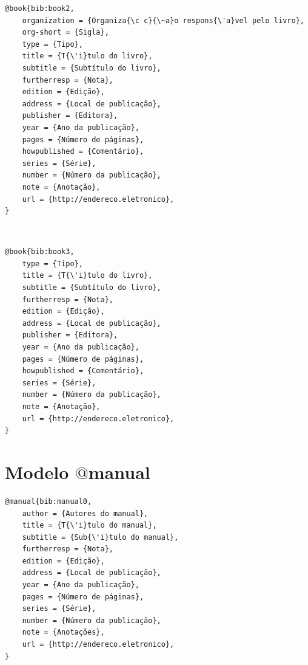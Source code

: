 \documentclass[a4paper,12pt,oneside,onecolumn,final,fleqn]{repUERJ}
\begin{document}
\noindent{}

\begin{verbatim}
@book{bib:book2,
    organization = {Organiza{\c c}{\~a}o respons{\'a}vel pelo livro},
    org-short = {Sigla},
    type = {Tipo},
    title = {T{\'i}tulo do livro},
    subtitle = {Subtítulo do livro},
    furtherresp = {Nota},
    edition = {Edição},
    address = {Local de publicação},
    publisher = {Editora},
    year = {Ano da publicação},
    pages = {Número de páginas},
    howpublished = {Comentário},
    series = {Série},
    number = {Número da publicação},
    note = {Anotação},
    url = {http://endereco.eletronico},
}
\end{verbatim}

\noindent{}\\

\begin{verbatim}
@book{bib:book3,
    type = {Tipo},
    title = {T{\'i}tulo do livro},
    subtitle = {Subtítulo do livro},
    furtherresp = {Nota},
    edition = {Edição},
    address = {Local de publicação},
    publisher = {Editora},
    year = {Ano da publicação},
    pages = {Número de páginas},
    howpublished = {Comentário},
    series = {Série},
    number = {Número da publicação},
    note = {Anotação},
    url = {http://endereco.eletronico},
}
\end{verbatim}

\section{Modelo $@$manual}

\noindent{}

\begin{verbatim}
@manual{bib:manual0,
    author = {Autores do manual},
    title = {T{\'i}tulo do manual},
    subtitle = {Sub{\'i}tulo do manual},
    furtherresp = {Nota},
    edition = {Edição},
    address = {Local de publicação},
    year = {Ano da publicação},
    pages = {Número de páginas},
    series = {Série},
    number = {Número da publicação},
    note = {Anotações},
    url = {http://endereco.eletronico},
}
\end{verbatim}

\noindent{}
\end{document}
